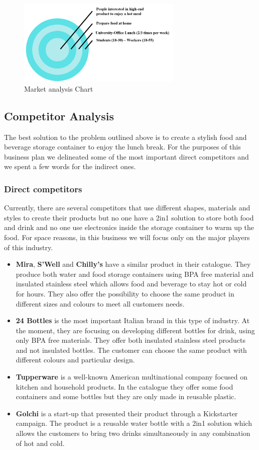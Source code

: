 \begin{figure}[H]
\centering
\includegraphics[width=0.7\textwidth]{images/market_chart.PNG}
\caption{Market analysis Chart}
\end{figure}

\subsection{Competitor Analysis}
The best solution to the problem outlined above is to create a stylish food and beverage storage container to enjoy the lunch break. For the purposes of this business plan we delineated some of the most important direct competitors and we spent a few words for the indirect ones.

\subsubsection{Direct competitors}
Currently, there are several competitors that use different shapes, materials and styles to create their products but no one have a 2in1 solution to store both food and drink and no one use electronics inside the storage container to warm up the food. For space reasons, in this business we will focus only on the major players of this industry.
\begin{itemize}
\item \textbf{Mira}, \textbf{S’Well} and \textbf{Chilly’s} have a similar product in their catalogue. They produce both water and food storage containers using BPA free material and insulated stainless steel which allows food and beverage to stay hot or cold for hours. They also offer the possibility to choose the same product in different sizes and colours to meet all customers needs.
\item \textbf{24 Bottles} is the most important Italian brand in this type of industry. At the moment, they are focusing on developing different bottles for drink, using only BPA free materials. They offer both insulated stainless steel products and not insulated bottles. The customer can choose the same product with different colours and particular design.
\item \textbf{Tupperware} is a well-known American multinational company focused on kitchen and household products. In the catalogue they offer some food containers and some bottles but they are only made in reusable plastic.
\item \textbf{Golchi} is a start-up that presented their product through a Kickstarter campaign. The product is a reusable water bottle with a 2in1 solution which allows the customers to bring two drinks simultaneously in any combination of hot and cold.
\end{itemize}

